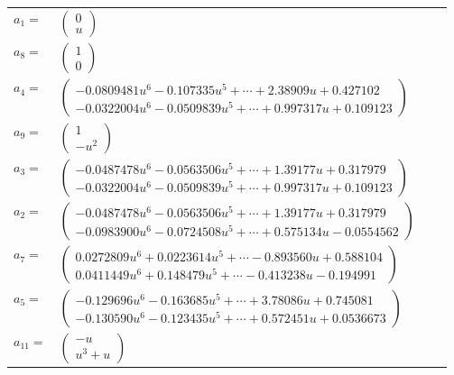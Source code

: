 \documentclass[1p]{elsarticle_modified}
\theoremstyle{definition}
\begin{document}
\begin{tabular}{m{7pt} m{180pt} m{7pt} m{180pt} }
\flushright $a_{1}=$&$\begin{pmatrix}0\\u\end{pmatrix}$ \\
\flushright $a_{8}=$&$\begin{pmatrix}1\\0\end{pmatrix}$ \\
\flushright $a_{4}=$&$\begin{pmatrix}-0.0809481 u^{6}-0.107335 u^{5}+\cdots+2.38909 u+0.427102\\-0.0322004 u^{6}-0.0509839 u^{5}+\cdots+0.997317 u+0.109123\end{pmatrix}$ \\
\flushright $a_{9}=$&$\begin{pmatrix}1\\- u^2\end{pmatrix}$ \\
\flushright $a_{3}=$&$\begin{pmatrix}-0.0487478 u^{6}-0.0563506 u^{5}+\cdots+1.39177 u+0.317979\\-0.0322004 u^{6}-0.0509839 u^{5}+\cdots+0.997317 u+0.109123\end{pmatrix}$ \\
\flushright $a_{2}=$&$\begin{pmatrix}-0.0487478 u^{6}-0.0563506 u^{5}+\cdots+1.39177 u+0.317979\\-0.0983900 u^{6}-0.0724508 u^{5}+\cdots+0.575134 u-0.0554562\end{pmatrix}$ \\
\flushright $a_{7}=$&$\begin{pmatrix}0.0272809 u^{6}+0.0223614 u^{5}+\cdots-0.893560 u+0.588104\\0.0411449 u^{6}+0.148479 u^{5}+\cdots-0.413238 u-0.194991\end{pmatrix}$ \\
\flushright $a_{5}=$&$\begin{pmatrix}-0.129696 u^{6}-0.163685 u^{5}+\cdots+3.78086 u+0.745081\\-0.130590 u^{6}-0.123435 u^{5}+\cdots+0.572451 u+0.0536673\end{pmatrix}$ \\
\flushright $a_{11}=$&$\begin{pmatrix}- u\\u^3+u\end{pmatrix}$ \\

\end{tabular}
\end{document}
